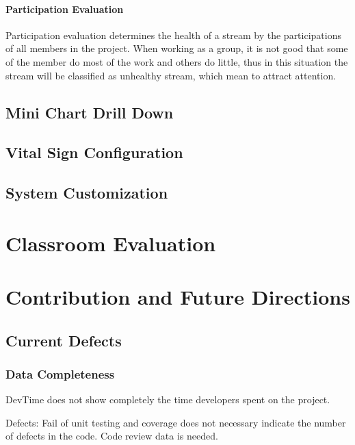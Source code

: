 \subsubsection{Participation Evaluation}
Participation evaluation determines the health of a stream by the participations of all members in the project. When working as a group, it is not good that some of the member do most of the work and others do little, thus in this situation the stream will be classified as unhealthy stream, which mean to attract attention.

\section{Mini Chart Drill Down}

\section{Vital Sign Configuration}
\label{SICUconfiguration}

\section{System Customization}

\chapter{Classroom Evaluation}

\chapter{Contribution and Future Directions}

\section{Current Defects}

\subsection{Data Completeness}

DevTime does not show completely the time developers spent on the project. 

Defects: Fail of unit testing and coverage does not necessary indicate the number of defects in the code. Code review data is needed. 


